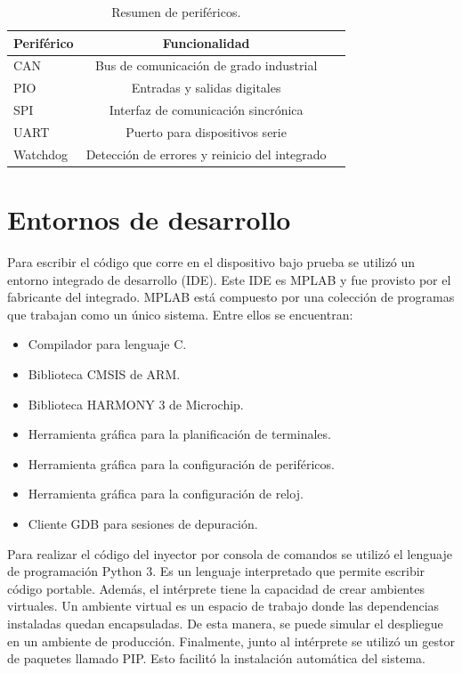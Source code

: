 \begin{table}[h]
	\centering
	\caption[Resumen de periféricos]{Resumen de periféricos.}
	\begin{tabular}{l c c}    
		\toprule
        \textbf{Periférico} & \textbf{Funcionalidad}\\
		\midrule
		CAN                 & Bus de comunicación de grado industrial\\        	
		PIO                 & Entradas y salidas digitales\\
		SPI                 & Interfaz de comunicación sincrónica\\
		UART                & Puerto para dispositivos serie\\
		Watchdog            & Detección de errores y reinicio del integrado\\
		\bottomrule
		\hline
	\end{tabular}
	\label{tab:perifericosresumen}
\end{table}

\newpage

\section{Entornos de desarrollo}
\label{sec:entornos}

Para escribir el código que corre en el dispositivo bajo prueba se utilizó un entorno integrado de desarrollo (IDE).
Este IDE es MPLAB y fue provisto por el fabricante del integrado.
MPLAB está compuesto por una colección de programas que trabajan como un único sistema.
Entre ellos se encuentran:

\begin{itemize}
    \item Compilador para lenguaje C.
    \item Biblioteca CMSIS de ARM.
    \item Biblioteca HARMONY 3 de Microchip.
    \item Herramienta gráfica para la planificación de terminales.
    \item Herramienta gráfica para la configuración de periféricos.
    \item Herramienta gráfica para la configuración de reloj.
    \item Cliente GDB para sesiones de depuración.
\end{itemize}

Para realizar el código del inyector por consola de comandos se utilizó el lenguaje de programación Python 3.
Es un lenguaje interpretado que permite escribir código portable.
Además, el intérprete tiene la capacidad de crear ambientes virtuales.
Un ambiente virtual es un espacio de trabajo donde las dependencias instaladas quedan encapsuladas.
De esta manera, se puede simular el despliegue en un ambiente de producción.
Finalmente, junto al intérprete se utilizó un gestor de paquetes llamado PIP.
Esto facilitó la instalación automática del sistema.

